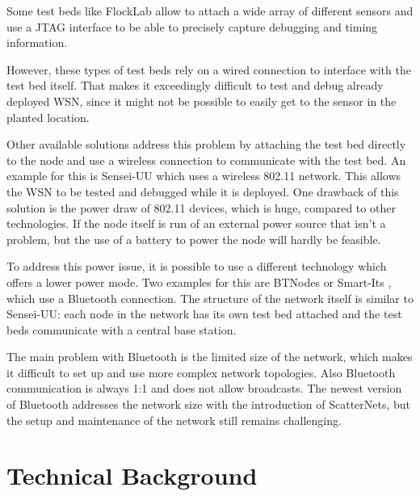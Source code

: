 Some test beds like FlockLab \cite{Lim2013} allow to attach a wide array of different sensors and use a JTAG interface to be able to precisely capture debugging and timing information.
 
However, these types of test beds rely on a wired connection to interface with the test bed itself. That makes it exceedingly difficult to test and debug already deployed WSN, since it might not be possible to easily get to the sensor in the planted location.

Other available solutions address this problem by attaching the test bed directly to the node and use a wireless connection to communicate with the test bed. An example for this is Sensei-UU \cite{Rensfelt2009} which uses a wireless 802.11 network. This allows the WSN to be tested and debugged while it is deployed. One drawback of this solution is the power draw of 802.11 devices, which is huge, compared to other technologies. If the node itself is run of an external power source that isn't a problem, but the use of a battery to power the node will hardly be feasible.

To address this power issue, it is possible to use a different technology which offers a lower power mode. Two examples for this are BTNodes \cite{Moser} or Smart-Its \cite{Kasten2000}, which use a Bluetooth connection. 
The structure of the network itself is similar to Sensei-UU: each node in the network has its own test bed attached and the test beds communicate with a central base station.

The main problem with Bluetooth is the limited size of the network, which makes it difficult to set up and use more complex network topologies. Also Bluetooth communication is always 1:1 and does not allow broadcasts. The newest version of Bluetooth addresses the network size with the introduction of ScatterNets, but the setup and maintenance of the network still remains challenging.

\chapter{Technical Background}
